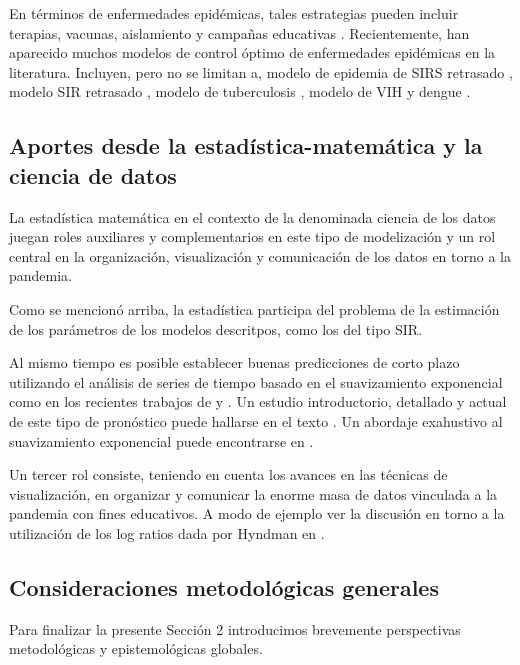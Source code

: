 \documentclass{article}
\begin{document}
  
 
 En términos de enfermedades epidémicas, tales estrategias pueden incluir terapias, vacunas, aislamiento y campañas educativas \cite{BKO,C}. Recientemente, han aparecido muchos modelos de control óptimo de enfermedades epidémicas en la literatura. Incluyen, pero no se limitan a, modelo de epidemia de SIRS retrasado \cite{AAC}, modelo SIR retrasado \cite{ALA,BGO}, modelo de tuberculosis \cite{ST}, modelo de VIH \cite{HY} y dengue \cite{AGS}.
 \newline 
 
 
 
 
 \subsection{Aportes desde la estadística-matemática y la ciencia de datos} 
  
La estadística matemática en el contexto de la denominada  ciencia de los datos juegan roles auxiliares y  complementarios en este tipo de modelización y un rol central en la organización, visualización y comunicación de los datos en torno a la pandemia. 


Como se mencionó arriba, la estadística participa del problema de la estimación de los parámetros de los modelos descritpos, como los del tipo SIR.   

Al mismo tiempo es posible establecer buenas predicciones de corto plazo utilizando el análisis de series de tiempo basado en el suavizamiento exponencial como en los recientes trabajos de \cite{JZC} y \cite{PM}. Un estudio introductorio, detallado y actual de este tipo de pronóstico puede hallarse en el texto  \cite{AthaHynd}.  Un abordaje exahustivo al suavizamiento exponencial puede encontrarse en \cite{Hyndvarios}. 



Un tercer rol consiste, teniendo en cuenta los avances en las técnicas de   visualización, en organizar y comunicar la enorme masa de datos vinculada a la pandemia con fines educativos.  A modo de ejemplo ver la discusión en torno a la utilización de los log ratios dada por Hyndman en \citep{hyn2}.


 
 \subsection{Consideraciones metodológicas generales} 
  
 Para finalizar la presente Sección 2 introducimos brevemente perspectivas metodológicas y epistemológicas globales.
 
\end{document}
